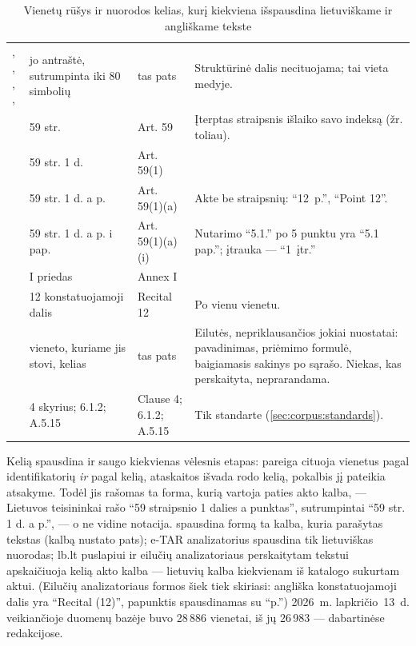 \begin{table}[H]
\caption{Vienetų rūšys ir nuorodos kelias, kurį kiekviena išspausdina lietuviškame ir angliškame tekste}\label{tab:corpus:units}
\begin{tabularx}{\textwidth}{@{}L{32mm}L{40mm}L{33mm}Y@{}}
\toprule
{} &  &  &  \\
\midrule
{}, , , ,  & jo antraštė, sutrumpinta iki 80 simbolių & tas pats & Struktūrinė dalis necituojama; tai vieta medyje. \\
 & 59 str. & Art. 59 & Įterptas straipsnis išlaiko savo indeksą (žr. toliau). \\
 & 59 str. 1 d. & Art. 59(1) & \\
 & 59 str. 1 d. a p. & Art. 59(1)(a) & Akte be straipsnių: \enquote{12~p.}, \enquote{Point 12}. \\
 & 59 str. 1 d. a p. i pap. & Art. 59(1)(a)(i) & Nutarimo \enquote{5.1.} po 5 punktu yra \enquote{5.1 pap.}; įtrauka --- \enquote{1~įtr.} \\
 & I priedas & Annex I & \\
 & 12 konstatuojamoji dalis & Recital 12 & Po vienu  vienetu. \\
 & vieneto, kuriame jis stovi, kelias & tas pats & Eilutės, nepriklausančios jokiai nuostatai: pavadinimas, priėmimo formulė, baigiamasis sakinys po sąrašo. Niekas, kas perskaityta, neprarandama. \\
 & 4 skyrius; 6.1.2; A.5.15 & Clause 4; 6.1.2; A.5.15 & Tik standarte (\cref{sec:corpus:standards}). \\
\bottomrule
\end{tabularx}
\end{table}

Kelią spausdina ir saugo kiekvienas vėlesnis etapas: pareiga cituoja vienetus pagal
identifikatorių \emph{ir} pagal kelią, ataskaitos išvada rodo kelią, pokalbis jį pateikia atsakyme.
Todėl jis rašomas ta forma, kurią vartoja paties akto kalba, --- Lietuvos teisininkai rašo
\enquote{59 straipsnio 1 dalies a punktas}, sutrumpintai \enquote{59 str. 1 d. a p.}, --- o ne
vidine notacija.  spausdina formą ta kalba, kuria parašytas tekstas (kalbą nustato pats); e-TAR
analizatorius spausdina tik lietuviškas nuorodas; lb.lt puslapiui ir eilučių analizatoriaus
perskaitytam tekstui  apskaičiuoja kelią akto kalba --- lietuvių kalba
kiekvienam iš katalogo sukurtam aktui. (Eilučių analizatoriaus formos šiek tiek skiriasi:
angliška konstatuojamoji dalis yra \enquote{Recital (12)}, papunktis spausdinamas su
\enquote{p.}) 2026~m. lapkričio~13~d. veikiančioje duomenų bazėje buvo 28\,886 vienetai, iš jų
26\,983 --- dabartinėse redakcijose.

